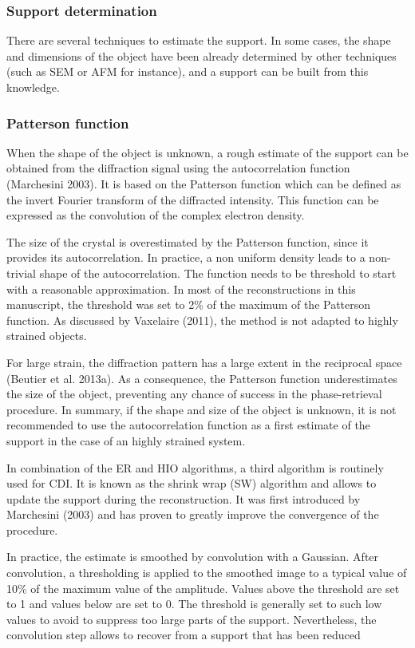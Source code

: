 \subsubsection{Support determination}
There are several techniques to estimate the support. In some cases, the shape and dimensions of the object have been already determined by other techniques (such as SEM or AFM for instance), and a support can be built from this knowledge. 

\subsubsection{Patterson function}
When the shape of the object is unknown, a rough estimate of the support can be obtained from the diffraction signal using the autocorrelation function (Marchesini 2003). It is based on the Patterson function which can be defined as the invert Fourier transform of the diffracted intensity. This function can be expressed as the convolution of the complex electron density.

The size of the crystal is overestimated by the Patterson function, since it provides its autocorrelation. In practice, a non uniform density leads to a non-trivial shape of the autocorrelation. The function needs to be threshold to start with a reasonable approximation. In most of the reconstructions in this manuscript, the threshold was set to 2\% of the maximum of the Patterson function. As discussed by Vaxelaire (2011), the method is not adapted to highly strained objects.

For large strain, the diffraction pattern has a large extent in the reciprocal space
(Beutier et al. 2013a). As a consequence, the Patterson function underestimates the size of the object, preventing any chance of success in the phase-retrieval procedure. In summary, if the shape and size of the object is unknown, it is not recommended to use the autocorrelation function as a first estimate of the support in the case of an highly strained system.

In combination of the ER and HIO algorithms, a third algorithm is routinely used for CDI. It is known as the shrink wrap (SW) algorithm and allows to update the support during the reconstruction. It was first introduced by Marchesini (2003) and has proven to greatly improve the convergence of the procedure.

In practice, the estimate is smoothed by convolution with a Gaussian. After convolution, a thresholding is applied to the smoothed image to a typical value of 10\% of the maximum value of the amplitude. Values above the threshold are set to 1 and values below are set to 0. The threshold is generally set to such low values to avoid to suppress too large parts of the support. Nevertheless, the convolution step allows to recover from a support that has been reduced

